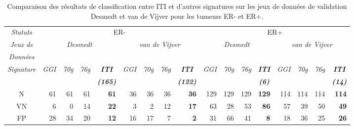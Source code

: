 			\begin{sidewaystable}
				\begin{center}
					\caption{Comparaison des résultats de classification entre ITI et d'autres signatures sur les jeux de données de validation Desmedt et van de Vijver pour les tumeurs ER- et ER+.}
					\begin{tabular}{crrrrrrrrrrrrrrrr}
						\toprule
						\multicolumn{1}{c}{\emph{Statuts}} & \multicolumn{8}{c}{ER-} & \multicolumn{8}{c}{ER+} \\
						\cmidrule(r){2-9}\cmidrule(r){10-17}
						\multicolumn{1}{c}{\emph{Jeux de}} & \multicolumn{4}{c}{\multirow{2}{*}{\emph{Desmedt}}} & \multicolumn{4}{c}{\multirow{2}{*}{\emph{van de Vijver}}} & \multicolumn{4}{c}{\multirow{2}{*}{\emph{Desmedt}}} & \multicolumn{4}{c}{\multirow{2}{*}{\emph{van de Vijver}}} \\
						\multicolumn{1}{c}{\emph{Données}} & & & & \\
						\cmidrule(r){2-5}\cmidrule(r){6-9}\cmidrule(r){10-13}\cmidrule(r){14-17}
						\multirow{2}{*}{\emph{Signature}} & \emph{GGI} & \emph{70g} & \emph{76g} & \multicolumn{1}{c}{\emph{\textbf{ITI}}} & \emph{GGI} & \emph{70g} & \emph{76g} & \multicolumn{1}{c}{\emph{\textbf{ITI}}} & \emph{GGI} & \emph{70g} & \emph{76g} & \multicolumn{1}{c}{\emph{\textbf{ITI}}} & \emph{GGI} & \emph{70g} & \emph{76g} & \multicolumn{1}{c}{\emph{\textbf{ITI}}}    \\
											&     &     &     & \multicolumn{1}{c}{\emph{\textbf{(165)}}}              &     &     &     & \multicolumn{1}{c}{\emph{\textbf{(122)}}}  &     &     &     & \multicolumn{1}{c}{\emph{\textbf{(6)}}}                &     &     &     & \multicolumn{1}{c}{\emph{\textbf{(14)}}}   \\
						\midrule
						N         & 61    & 61    & 61    & \textbf{61}                               & 36    & 36    & 36    & \textbf{36}                   & 129   & 129   & 129   & \textbf{129}                              & 114   & 114   & 114   & \textbf{114}                   \\
						\midrule
						VN        & 6     & 0     & 14    & \textbf{22}                               & 3     & 2     & 12    & \textbf{17}                   & 63    & 28    & 53    & \textbf{86}                               & 57    & 39    & 50    & \textbf{49}                    \\
						FP        & 28    & 34    & 20    & \textbf{12}                               & 16    & 17    & 7     & \textbf{2}                    & 31    & 66    & 41    & \textbf{8}                                & 18    & 36    & 25    & \textbf{26}                    \\

\end{tabular}
\end{center}
\end{sidewaystable}
